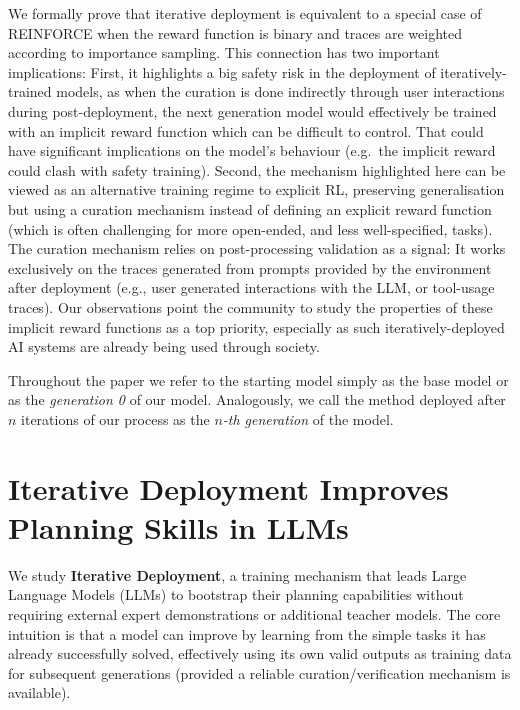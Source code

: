 \documentclass{article}
\renewcommand{\cite}[1]{\citep[][]{#1}}
\begin{document}
We formally prove that iterative deployment is equivalent to a special case of
REINFORCE \cite{williams-jml1992} when the reward function is binary and traces
are weighted according to importance sampling.
This connection has two important implications: First, it highlights a big safety risk in the deployment of iteratively-trained models, as when the curation is done indirectly through user interactions during post-deployment, the next generation model would effectively be trained with an implicit reward function which can be difficult to control. That could have significant implications on the model's behaviour (e.g.\ the implicit reward could clash with safety training).
Second, the mechanism highlighted here can be viewed as an alternative training regime to explicit RL, preserving generalisation but using a curation mechanism instead of defining an explicit reward
function (which is often challenging for more open-ended, and less
well-specified, tasks). The curation mechanism relies on post-processing validation as a
signal: It works exclusively on the traces generated from prompts provided by
the environment after deployment (e.g., user generated interactions with the
LLM, or tool-usage traces).
Our
observations point the community to study the properties of these implicit reward functions as a
top priority, especially as such iteratively-deployed AI systems are already being used through society.

Throughout the paper we refer to the starting model simply as the base model or as the
\emph{generation 0} of our model. Analogously, we call the method deployed after
$n$ iterations of our process as the \emph{$n$-th generation} of the model.



\section{Iterative Deployment Improves Planning Skills in LLMs}
\label{sec:mechanism}

We study \textbf{Iterative Deployment}, a training mechanism that leads Large Language Models (LLMs) to bootstrap their planning capabilities without requiring external expert demonstrations or additional teacher models. The core intuition is that a model can improve by learning from the simple tasks it has already successfully solved, effectively using its own valid outputs as training data for subsequent generations (provided a reliable curation/verification mechanism is available).
\end{document}
